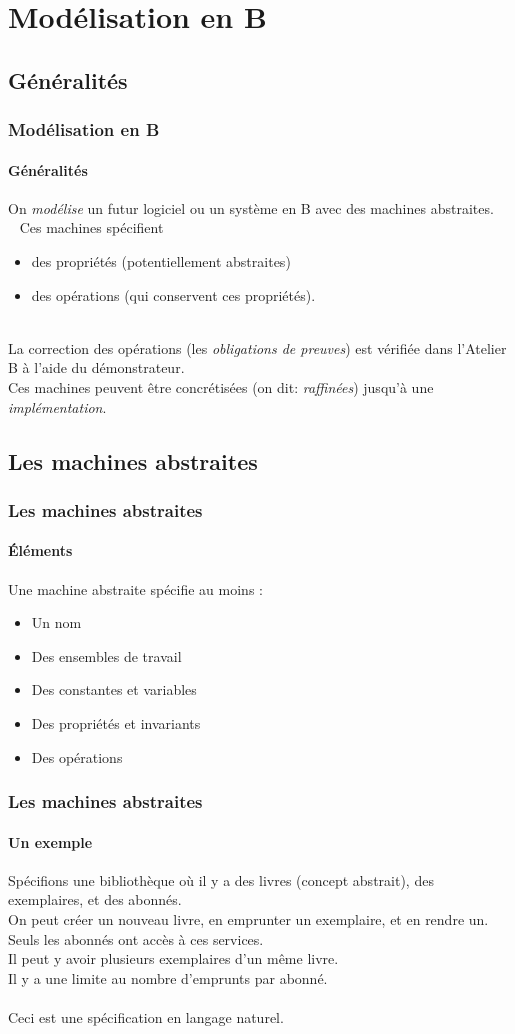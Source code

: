 \documentclass[11pt,a4paper,xcolor=table, handout]{beamer} %
\begin{document}
\section{Modélisation en B}
\subsection{Généralités}
\begin{frame}
\frametitle{Modélisation en B}
\framesubtitle{Généralités}
On \emph{modélise} un futur logiciel ou un système en B avec des machines abstraites.\\[5pt]~\pause
Ces machines spécifient\pause
\begin{itemize}
\item des propriétés (potentiellement abstraites)
\pause
\item des opérations (qui conservent ces propriétés).
\pause
\end{itemize}
~\\[0pt]
La correction des opérations (les \emph{obligations de preuves}) est vérifiée dans l'Atelier B à l'aide du démonstrateur.\pause\\[5pt]
Ces machines peuvent être concrétisées (on dit: \emph{raffinées}) jusqu'à une \emph{implémentation}.
\end{frame}

\subsection{Les machines abstraites}
\begin{frame}
\frametitle{Les machines abstraites}
\framesubtitle{Éléments}
Une machine abstraite spécifie au moins :
\begin{itemize}
\pause
\item Un nom
\pause
\item Des ensembles de travail
\pause
\item Des constantes et variables
\pause
\item Des propriétés et invariants
\pause
\item Des opérations
\end{itemize}
\end{frame}

\begin{frame}
\frametitle{Les machines abstraites}
\framesubtitle{Un exemple}
Spécifions une bibliothèque où il y a des livres (concept abstrait), des exemplaires, et des abonnés.\\\pause
On peut créer un nouveau livre, \pause en emprunter un exemplaire, \pause et en rendre un.
\\\pause Seuls les abonnés ont accès à ces services.
\\\pause Il peut y avoir plusieurs exemplaires d'un même livre.
\\\pause Il y a une limite au nombre d'emprunts par abonné.
\\~\\\pause Ceci est une spécification en langage naturel.
\end{frame}
\end{document}
